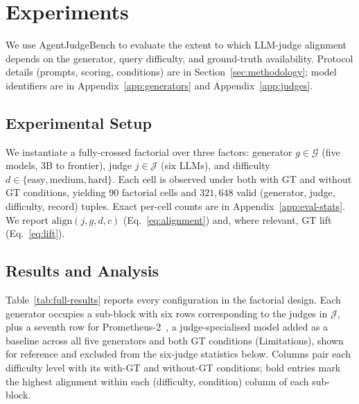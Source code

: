 \vspace{-0.2cm}
\section{Experiments}
\label{sec:experiments}
\vspace{-0.15cm}
We use AgentJudgeBench to evaluate the extent to which LLM-judge alignment depends on the generator, query difficulty, and ground-truth availability. Protocol details (prompts, scoring, conditions) are in Section~\ref{sec:methodology}; model identifiers are in Appendix~\ref{app:generators} and Appendix~\ref{app:judges}.

\subsection{Experimental Setup}
\label{sec:exp:design}
We instantiate a fully-crossed factorial over three factors: generator $g \in \mathcal{G}$ (five models, 3B to frontier), judge $j \in \mathcal{J}$ (six LLMs), and difficulty $d \in \{\text{easy}, \text{medium}, \text{hard}\}$. Each cell is observed under both with GT and without GT conditions, yielding 90 factorial cells and $321{,}648$ valid (generator, judge, difficulty, record) tuples. Exact per-cell counts are in Appendix~\ref{app:eval-stats}. We report $\mathrm{align}(j, g, d, c)$ (Eq.~\ref{eq:alignment}) and, where relevant, GT lift (Eq.~\ref{eq:lift}).

\subsection{Results and Analysis}
\label{sec:exp:main}
Table~\ref{tab:full-results} reports every configuration in the factorial design. Each generator occupies a sub-block with six rows corresponding to the judges in $\mathcal{J}$, plus a seventh row for Prometheus-2~\citep{kim2024prometheus2}, a judge-specialised model added as a baseline across all five generators and both GT conditions (Limitations), shown for reference and excluded from the six-judge statistics below. Columns pair each difficulty level with its with-GT and without-GT conditions; bold entries mark the highest alignment within each (difficulty, condition) column of each sub-block.

